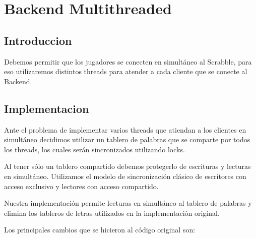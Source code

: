 \section{Backend Multithreaded}
\subsection{Introduccion}
Debemos permitir que los jugadores se conecten en simultáneo al Scrabble, para eso utilizaremos distintos threads para atender a cada cliente que se conecte al Backend.

\subsection{Implementacion}
Ante el problema de implementar varios threads que atiendan a los clientes en simultáneo decidimos utilizar un tablero de palabras que se comparte por todos los threads, los cuales serán sincronizados utilizando locks.

Al tener sólo un tablero compartido debemos protegerlo de escrituras y lecturas en simultáneo. Utilizamos el modelo de sincronización clásico de escritores con acceso exclusivo y lectores con acceso compartido.

Nuestra implementación permite lecturas en simultáneo al tablero de palabras y elimina los tableros de letras utilizados en la implementación original.

Los principales cambios que se hicieron al código original son:

